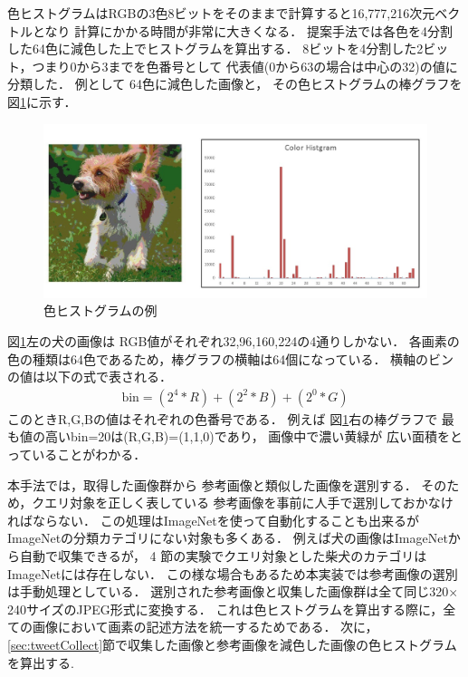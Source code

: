 \documentclass{deimj}
\begin{document}
色ヒストグラムはRGBの3色8ビットをそのままで計算すると16,777,216次元ベクトルとなり
計算にかかる時間が非常に大きくなる．
提案手法では各色を4分割した64色に減色した上でヒストグラムを算出する．
8ビットを4分割した2ビット，つまり0から3までを色番号として
代表値(0から63の場合は中心の32)の値に分類した．
例として
64色に減色した画像と，
その色ヒストグラムの棒グラフを
図\ref{fig:color}に示す．
%
\begin{figure}[tb]
 \begin{center}
  \includegraphics[scale=0.28]{colorhist.jpg}
 \end{center}
 \caption{色ヒストグラムの例}
 \label{fig:color}
\end{figure}
%
%
図\ref{fig:color}左の犬の画像は
RGB値がそれぞれ32,96,160,224の4通りしかない．
各画素の色の種類は64色であるため，棒グラフの横軸は64個になっている．
横軸のビンの値は以下の式で表される．
\begin{eqnarray}
\mbox{bin} = (2^4 * R) + (2^2 * B) + (2^0 * G)
\end{eqnarray}
このときR,G,Bの値はそれぞれの色番号である．
例えば
図\ref{fig:color}右の棒グラフで
最も値の高いbin=20は(R,G,B)=(1,1,0)であり，
画像中で濃い黄緑が
広い面積をとっていることがわかる．

本手法では，取得した画像群から
参考画像と類似した画像を選別する．
そのため，クエリ対象を正しく表している
参考画像を事前に人手で選別しておかなければならない．
この処理はImageNetを使って自動化することも出来るが
ImageNetの分類カテゴリにない対象も多くある．
例えば犬の画像はImageNetから自動で収集できるが，
4
節の実験でクエリ対象とした柴犬のカテゴリはImageNetには存在しない．
この様な場合もあるため本実装では参考画像の選別は手動処理としている．
%
選別された参考画像と収集した画像群は全て同じ320$\times$240サイズのJPEG形式に変換する．
これは色ヒストグラムを算出する際に，全ての画像において画素の記述方法を統一するためである．
次に，\ref{sec:tweetCollect}節で収集した画像と参考画像を減色した画像の色ヒストグラムを算出する.
\end{document}
